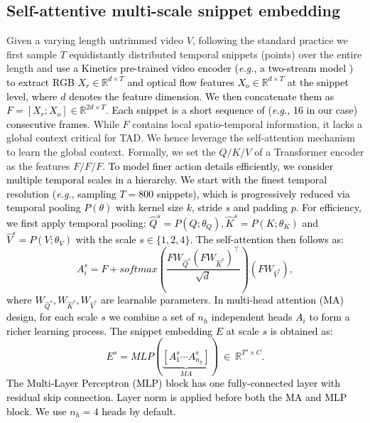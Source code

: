 \documentclass[runningheads]{llncs}
\newcommand{\eg}{\textit{e.g.}}
\begin{document}
\subsection{Self-attentive multi-scale snippet embedding}
\label{sec:model_embedding}
Given a varying length untrimmed video $V$,
following the standard practice \cite{xu2020g,lin2019bmn} we first sample $T$ equidistantly distributed temporal snippets (points) over the entire length and \textcolor{black}{use a Kinetics pre-trained video encoder 
(\eg, a two-stream model \cite{wang2016temporal}) to extract 
RGB $X_{r} \in \mathbb{R}^{d \times T}$ and optical flow features $X_{o} \in \mathbb{R}^{d \times T}$ at the snippet level, where $d$ denotes the feature dimension. 
We then concatenate them as $F=[ X_{r};X_{o}] \in \mathbb{R}^{2d \times T}$.
Each snippet is a short sequence of (\eg, 16 in our case) consecutive frames.}
While $F$ contains local spatio-temporal information, 
it lacks a global context critical for TAD.
We hence leverage the self-attention mechanism \cite{vaswani2017attention} to learn the global context. 
Formally, we set the $Q/K/V$ of a Transformer encoder
as the features $F/F/F$.
\textcolor{black}{
To model finer action details efficiently,
we consider multiple temporal scales in a hierarchy.
We start with the finest temporal resolution \textcolor{black}{(\eg, sampling $T=800$ snippets)},
which is progressively reduced via temporal pooling $P(\theta)$
with kernel size $k$, stride $s$ and padding $p$.
For efficiency, we first apply temporal pooling:
$\hat{Q}^{s} = P(Q;\theta_{Q}), 
\hat{K}^{s} = P(K;\theta_{K})$ and $\hat{V}^{s} = P(V;\theta_{V})$ with 
the scale $s \in \{1,2,4\}$.
The self-attention then follows as:
\begin{equation}\label{eqn_1}
A_{i}^{s} = F + softmax(\frac{F W_{\hat{Q}^{s}} ({F} W_{\hat{K}^{s}})^{\top}}{\sqrt{d}}) ({F} W_{\hat{V}^{s}}),
\end{equation}
where $W_{\hat{Q}^{s}}, W_{\hat{K}^{s}}, W_{\hat{V}^{s}}$ are learnable parameters. In multi-head attention (MA) design, for each scale $s$ we combine a set of $n_{h}$ independent heads $A_{i}$ to form a richer learning process. The snippet embedding $E$ at scale $s$ is obtained as:
\begin{equation}\label{eqn_2}
E^{s} = MLP(\underset{MA}{\underbrace{[A_{1}^{s} \cdots A_{n_h}^{s}]}}) \ \in \ \mathbb{R}^{T^{s} \times C}.
\end{equation}
The {Multi-Layer Perceptron} (MLP) block has one fully-connected layer with residual skip connection. Layer norm is applied before both the MA and MLP block. 
We use $n_h=4$ heads by default.
}
\end{document}
